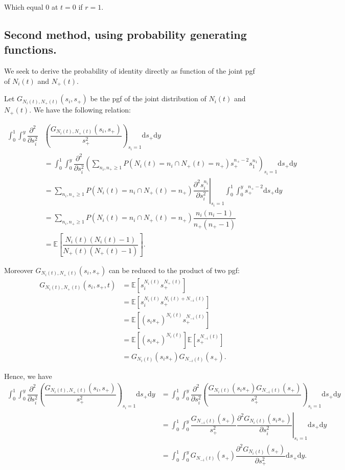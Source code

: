 \documentclass{article}
\newcommand{\ud}{\mathrm{d}}
\begin{document}
Which equal $0$ at $t=0$ if $r=1$.

 \subsection{Second method, using probability generating functions.}
 We seek to derive the probability of identity directly as function of the joint pgf of $N_i(t)$ and $N_+(t)$.
 
 Let $G_{N_i(t) ,N_+(t)}(s_i,s_+)$ be the pgf of the joint distribution of $N_i(t)$ and $N_+(t)$. We have the following relation:
 
 \begin{align}
 \displaystyle \int_0^1 \int_0^y \dfrac{\partial^2 }{\partial s_i^2} & \left( \dfrac{G_{N_i(t) ,N_+(t)}(s_i,s_+)}{s_+^2} \right)_{s_i =1} \ud s_+ \ud y \\
 &= \int_0^1 \int_0^y \dfrac{\partial^2 }{\partial s_i^2} \left( \sum_{n_i,n_+ \geq 1} P(N_i(t)=n_i \cap N_+(t)=n_+) s_+^{n_+ -2} s_1^{n_1} \right)_{s_i =1} \ud s_+ \ud y \\ 
 &= \sum_{n_i,n_+ \geq 1} P(N_i(t)=n_i \cap N_+(t)=n_+) \left.  \dfrac{\partial^2 s_i^{n_i}}{\partial s_i^2} \right\vert_{s_i=1} \int_0^1 \int_0^y s_+^{n_+-2} \ud s_+ \ud y\\
 &= \sum_{n_i  ,n_+ \geq 1} P(N_i(t)=n_i \cap N_+(t)=n_+) \dfrac{n_i(n_i-1)}{n_+(n_+-1)}\\
 &= \mathbb{E}\left[ \dfrac{N_i(t)(N_i(t)-1)}{N_+(t) ( N_+(t)-1 )} \right].
 \end{align}
 
 Moreover $G_{N_i(t) ,N_+(t)}(s_i,s_+)$ can be reduced to the product of two pgf: 
  \begin{align}
G_{N_i(t) ,N_+(t)}(s_i,s_+,t) &= \mathbb{E} [ s_i^{N_i(t)} s_+^{N_+(t)}] \\
		&= \mathbb{E} [ s_i^{N_i(t)} s_+^{N_i(t)+N_{-i}(t)}]\\
		&= \mathbb{E} [ (s_i s_+)^{N_i(t)} s_+^{N_{-i}(t)}] \\
		&= \mathbb{E} [ (s_i s_+)^{N_i(t)} ]\mathbb{E} [ s_+^{N_{-i}(t)}] \\
		&= G_{N_i(t)}(s_i s_+) G_{N_{-i}(t)}(s_+).
 \end{align}
 
 Hence, we have 
   \begin{align}
\displaystyle \int_0^1 \int_0^y \dfrac{\partial^2 }{\partial s_i^2} \left( \dfrac{G_{N_i(t) ,N_+(t)}(s_i,s_+)}{s_+^2} \right)_{s_i =1} \ud s_+ \ud y
 &= \int_0^1 \int_0^y \dfrac{\partial^2 }{\partial s_i^2} \left( \dfrac{ G_{N_i(t)}(s_i s_+) G_{N_{-i}(t)}(s_+)}{s_+^2} \right)_{s_i =1} \ud s_+ \ud y \\
  &= \int_0^1 \int_0^y \dfrac{G_{N_{-i}(t)}(s_+)}{s_+^2} \left. \dfrac{\partial^2  G_{N_i(t)}(s_i s_+)  }{\partial s_i^2} \right\vert_{s_i =1} \ud s_+ \ud y \\
    &= \int_0^1 \int_0^y G_{N_{-i}(t)}(s_+) \dfrac{\partial^2  G_{N_i(t)}(s_+)  }{\partial s_+^2} \ud s_+ \ud y.
 \end{align}
 
\end{document}
